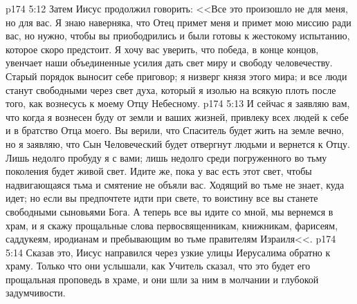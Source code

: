 \vs p174 5:12 Затем Иисус продолжил говорить: <<Все это произошло не для меня, но для вас. Я знаю наверняка, что Отец примет меня и примет мою миссию ради вас, но нужно, чтобы вы приободрились и были готовы к жестокому испытанию, которое скоро предстоит. Я хочу вас уверить, что победа, в конце концов, увенчает наши объединенные усилия дать свет миру и свободу человечеству. Старый порядок выносит себе приговор; я низверг князя этого мира; и все люди станут свободными через свет духа, который я изолью на всякую плоть после того, как вознесусь к моему Отцу Небесному.
\vs p174 5:13 И сейчас я заявляю вам, что когда я вознесен буду от земли и ваших жизней, привлеку всех людей к себе и в братство Отца моего. Вы верили, что Спаситель будет жить на земле вечно, но я заявляю, что Сын Человеческий будет отвергнут людьми и вернется к Отцу. Лишь недолго пробуду я с вами; лишь недолго среди погруженного во тьму поколения будет живой свет. Идите же, пока у вас есть этот свет, чтобы надвигающаяся тьма и смятение не объяли вас. Ходящий во тьме не знает, куда идет; но если вы предпочтете идти при свете, то воистину все вы станете свободными сыновьями Бога. А теперь все вы идите со мной, мы вернемся в храм, и я скажу прощальные слова первосвященникам, книжникам, фарисеям, саддукеям, иродианам и пребывающим во тьме правителям Израиля<<.
\vs p174 5:14 Сказав это, Иисус направился через узкие улицы Иерусалима обратно к храму. Только что они услышали, как Учитель сказал, что это будет его прощальная проповедь в храме, и они шли за ним в молчании и глубокой задумчивости.
